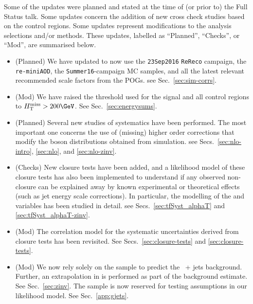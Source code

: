 Some of the updates were planned and stated at the time of (or prior
to) the Full Status talk. Some updates concern the addition of new
cross check studies based on the control regions. Some updates
represent modifications to the analysis selections and/or
methods. These updates, labelled as ``Planned'', ``Checks'', or
``Mod'', are summarised below.
  
\begin{itemize}
  
\item (Planned) We have updated to now use the \verb!23Sep2016!
  \verb!ReReco! campaign, the \verb!re-miniAOD!, the
  \verb!Summer16!-campaign MC samples, and all the latest relevant
  recommended scale factors from the POGs. \eg see
  Sec.~\ref{sec:sim-corrs}.
  
\item (Mod) We have raised the \HTmiss threshold used for the signal
  and all control regions to $\HTmiss > 200\GeV$. See
  Sec.~\ref{sec:energysums}.
    
\item (Planned) Several new studies of systematics have been
  performed. The most important one concerns the use of (missing)
  higher order corrections that modify the boson \Pt distributions
  obtained from simulation. \eg see Secs.~\ref{sec:nlo-intro},
  \ref{sec:nlo}, and \ref{sec:nlo-zinv}.

\item (Checks) New closure tests have been added, and a likelihood
  model of these closure tests has also been implemented to understand
  if any observed non-closure can be explained away by known
  experimental or theoretical effects (such as jet energy scale
  corrections). In particular, the modelling of the \alphat and \bdphi
  variables has been studied in detail. \eg see
  Secs.~\ref{sec:tfSyst_alphaT} and \ref{sec:tfSyst_alphaT-zinv}.

\item (Mod) The correlation model for the systematic uncertainties
  derived from closure tests has been revisited. See
  Secs.~\ref{sec:closure-tests} and \ref{sec:closure-tests}.


\item (Mod) We now rely solely on the \mmj sample to predict the
  \znunu\ + jets background. Further, an extrapolation in \nb is
  performed as part of the \znunuj background estimate. See
  Sec.~\ref{sec:zinv}. The \gj sample is now reserved for testing
  assumptions in our likelihood model. See Sec.~\ref{app:gjets}.


\end{itemize}
